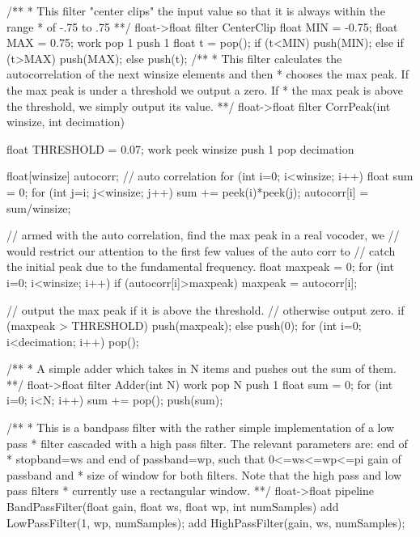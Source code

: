 /** 
 * This filter "center clips" the input value so that it is always within the range
 * of -.75 to .75
 **/
float->float filter CenterClip {
    float MIN = -0.75;
    float MAX =  0.75;
    work pop 1 push 1 {
        float t = pop();
        if (t<MIN) {
            push(MIN); 
        } else if (t>MAX) {
            push(MAX);
        } else {
            push(t);
        }
    }
}
/** 
 * This filter calculates the autocorrelation of the next winsize elements and then
 * chooses the max peak. If the max peak is under a threshold we output a zero. If
 * the max peak is above the threshold, we simply output its value.
 **/
float->float filter CorrPeak(int winsize, int decimation) {
    float THRESHOLD = 0.07;
    work peek winsize push 1 pop decimation {
        float[winsize] autocorr; // auto correlation
        for (int i=0; i<winsize; i++) {
            float sum = 0;
            for (int j=i; j<winsize; j++) {
                sum += peek(i)*peek(j);
            }
            autocorr[i] = sum/winsize;
        }

        // armed with the auto correlation, find the max peak in a real vocoder, we
        // would restrict our attention to the first few values of the auto corr to
        // catch the initial peak due to the fundamental frequency.
        float maxpeak = 0;
        for (int i=0; i<winsize; i++) {
            if (autocorr[i]>maxpeak) {
                maxpeak = autocorr[i];
            }
        }
    
        // output the max peak if it is above the threshold.
        // otherwise output zero.
        if (maxpeak > THRESHOLD) {
            push(maxpeak);
        } else {
            push(0);
        }
        for (int i=0; i<decimation; i++) {
            pop();
        }
    }
}          
/**
 * A simple adder which takes in N items and pushes out the sum of them.
 **/
float->float filter Adder(int N) {
    work pop N push 1 {
        float sum = 0;
        for (int i=0; i<N; i++) {
            sum += pop();
        }
        push(sum);
    }
}

/**
 * This is a bandpass filter with the rather simple implementation of a low pass
 * filter cascaded with a high pass filter. The relevant parameters are: end of
 * stopband=ws and end of passband=wp, such that 0<=ws<=wp<=pi gain of passband and
 * size of window for both filters. Note that the high pass and low pass filters
 * currently use a rectangular window.
 **/
float->float pipeline BandPassFilter(float gain, float ws, float wp, int numSamples) {
    add LowPassFilter(1, wp, numSamples);
    add HighPassFilter(gain, ws, numSamples);
}

